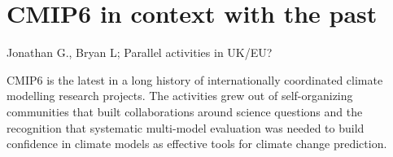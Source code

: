 \documentclass[gmd, preprint]{copernicus}
\newcommand{\mycomment}[1]{}
\def\cred#1{{\color{red}#1}}
\begin{document}
\mycomment{
Mention CMIP6 Community MIPs - mentioned in CMIP5 section.
Durack+Tayloretal_CMIP6POverview_GMD-CMIP6SpecialIssue
https://docs.google.com/document/d/1Bxu2djLsB0blUUjr4qtwNpZWqMFXkTQRY8kOR_EJvlA/edit?skip_itp2_check=true&pli=1
}


\section{CMIP6 in context with the past}
\label{sec:cmip6InContext}
\cred{Jonathan G., Bryan L; Parallel activities in UK/EU?}

CMIP6 is the latest in a long history of internationally coordinated climate modelling research projects. The activities grew out of self-organizing communities that built collaborations around science questions and the recognition that systematic multi-model evaluation was needed to build confidence in climate models as effective tools for climate change prediction.
\end{document}
